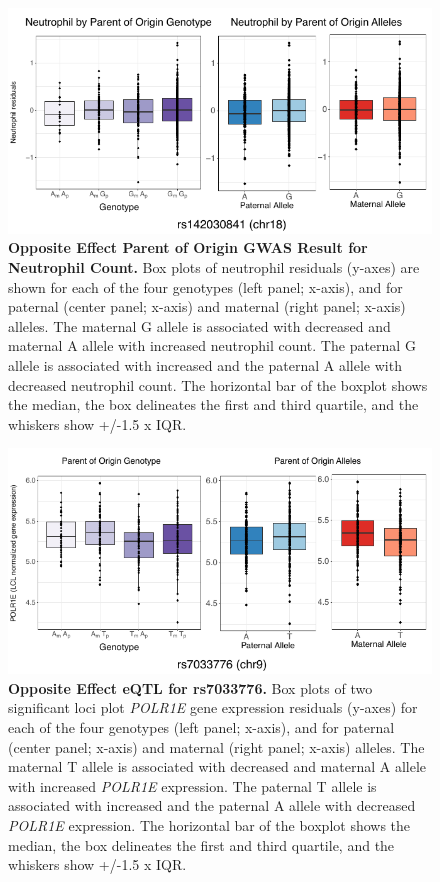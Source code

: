 \begin{figure}[!htb]
\centering
\includegraphics[width=5in]{img/ch02/fig-s14.pdf}
\caption[Opposite Effect Parent of Origin GWAS Result for Neutrophil Count.]{\textbf{Opposite Effect Parent of Origin GWAS Result for Neutrophil Count.}  Box plots of neutrophil residuals (y-axes) are shown for each of the four genotypes (left panel; x-axis), and for paternal (center panel; x-axis) and maternal (right panel; x-axis) alleles. The maternal G allele is associated with decreased and maternal A allele with increased neutrophil count. The paternal G allele is associated with increased and the paternal A allele with decreased neutrophil count. The horizontal bar of the boxplot shows the median, the box delineates the first and third quartile, and the whiskers show +/-1.5 x IQR.}
\label{fig:fig-s14}
\end{figure}






\begin{figure}[!htb]
\centering
\includegraphics[width=5in]{img/ch02/fig-s15.pdf}
\caption[Opposite Effect eQTL for rs7033776.]{\textbf{Opposite Effect eQTL for rs7033776.} Box plots of two significant loci plot \emph{POLR1E} gene expression residuals (y-axes) for each of the four genotypes (left panel; x-axis), and for paternal (center panel; x-axis) and maternal (right panel; x-axis) alleles. The maternal T allele is associated with decreased and maternal A allele with increased \emph{POLR1E} expression. The paternal T allele is associated with increased and the paternal A allele with decreased \emph{POLR1E} expression. The horizontal bar of the boxplot shows the median, the box delineates the first and third quartile, and the whiskers show +/-1.5 x IQR.}
\label{fig:fig-s15}
\end{figure}



